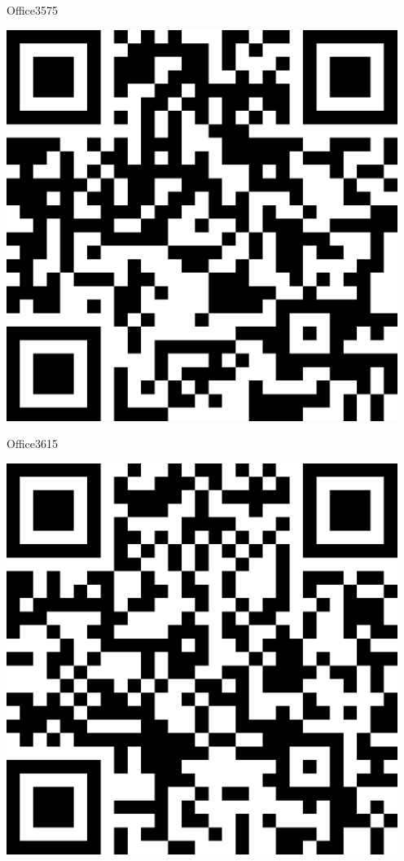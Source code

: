 \documentclass[letterpaper]{article}
\begin{document}
 \hfill{\small Office3575} 

 \vspace{1in} 
 \pagebreak 
{} 
 \vspace*{\fill} 
 \begingroup 
 \centerline{\includegraphics[scale=1,width=5in,height=5in]{Office3615.png}} 
 \endgroup 
 \vspace*{\fill} 

 \hfill{\small Office3615} 

 \vspace{1in} 
 \pagebreak 
{} 
 \vspace*{\fill} 
 \begingroup 
 \centerline{\includegraphics[scale=1,width=5in,height=5in]{Office3617.png}} 
 \endgroup 
 \vspace*{\fill} 
\end{document}

